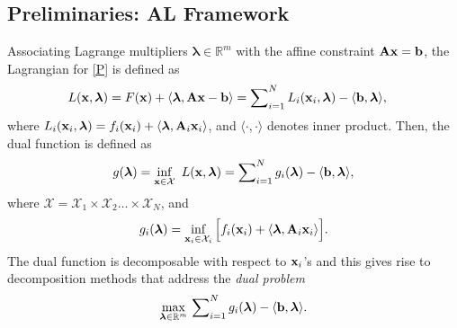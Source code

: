 \documentclass[doublecolumn]{IEEEtran}
\begin{document}
\subsection{Preliminaries: AL Framework}
Associating Lagrange multipliers ${\boldsymbol{\lambda}}\in{\mathbb R}^m$ with the affine constraint ${ {\bf A} } { {\bf x} } = { {\bf b} }$, the Lagrangian for \eqref{P}  is defined as
\begin{align}\label{ord_lagr}
L({ {\bf x} },{\boldsymbol{\lambda}}) &= F({ {\bf x} }) + \langle {\boldsymbol{\lambda}}, { {\bf A} } { {\bf x} } -{ {\bf b} }\rangle
= \sum\nolimits_{i=1}^{N} L_i ({ {\bf x} }_i,{\boldsymbol{\lambda}}) -\langle { {\bf b} },{\boldsymbol{\lambda}}\rangle,
\end{align}
where $L_i ({ {\bf x} }_i,{\boldsymbol{\lambda}}) = f_i({\bf x}_i) + \langle  {\boldsymbol{\lambda}} , { {\bf A} }_i { {\bf x} }_i\rangle$, and $\langle\cdot,\cdot\rangle$ denotes inner product. Then, the dual function is defined as
\begin{equation}\label{dual_functional}
g({\boldsymbol{\lambda}}) = \inf_{{ {\bf x} }\in\mathcal{ X}} ~L({ {\bf x} },{\boldsymbol{\lambda}}) = \sum\nolimits_{i=1}^{N} g_i({\boldsymbol{\lambda}}) -\langle { {\bf b} },{\boldsymbol{\lambda}}\rangle,
\end{equation}
where $\mathcal{X}= \mathcal{X}_{1}\times\mathcal{X}_{2}\dots\times\mathcal{X}_{N}$, and
\begin{equation*}\label{dual_functionals}
g_i({\boldsymbol{\lambda}}) = \inf_{{ {\bf x} }_i\in\mathcal{ X}_i} \Big[  f_i({\bf x}_i) + \langle  {\boldsymbol{\lambda}} , {\bf A}_i {\bf x}_i\rangle \Big].
\end{equation*}
The dual function is decomposable with respect to ${ {\bf x} }_i$'s and this gives rise to decomposition methods that address the  \emph{dual problem} \cite[Chapter 2.6]{Berts1}
\begin{equation}\label{D}
\max_{{\boldsymbol{\lambda}}\in\mathbb{R}^m} \, \sum\nolimits_{i=1}^{N} g_i({\boldsymbol{\lambda}}) -\langle { {\bf b} },{\boldsymbol{\lambda}}\rangle.
\end{equation}
\end{document}
